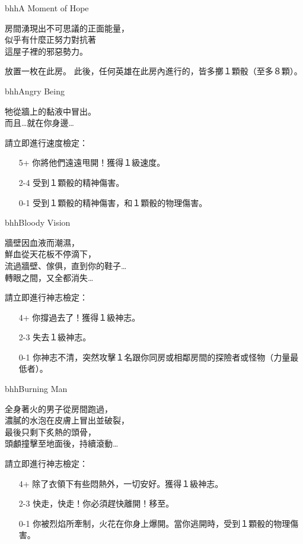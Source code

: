 %
\begin{EventCard}{bhh}{A Moment of Hope}
  \begin{CardStory}
    房間湧現出不可思議的正面能量，\\
    似乎有什麼正努力對抗著\\
    這屋子裡的邪惡勢力。
  \end{CardStory}
  放置一枚在此房。\smallbreak
  此後，任何英雄在此房內進行的，皆多擲１顆骰（至多８顆）。\smallbreak
\end{EventCard}%
\linebreak[0]%
\begin{EventCard}{bhh}{Angry Being}
  \begin{CardStory}
    牠從牆上的黏液中冒出。\\
    而且…就在你身邊…
  \end{CardStory}
  請立即進行速度檢定：
  \begin{itemize}
    \item[5+] 你將他們遠遠甩開！獲得１級速度。
    \item[2-4] 受到１顆骰的精神傷害。
    \item[0-1] 受到１顆骰的精神傷害，和１顆骰的物理傷害。
  \end{itemize}
\end{EventCard}%
\linebreak[0]%
\begin{EventCard}{bhh}{Bloody Vision}
  \begin{CardStory}
    牆壁因血液而潮濕，\\
    鮮血從天花板不停滴下，\\
    流過牆壁、傢俱，直到你的鞋子…\\
    轉眼之間，又全都消失…
  \end{CardStory}
  請立即進行神志檢定：
  \begin{itemize}
    \item[4+] 你撐過去了！獲得１級神志。
    \item[2-3] 失去１級神志。
    \item[0-1] 你神志不清，突然攻擊１名跟你同房或相鄰房間的探險者或怪物（力量最低者）。
  \end{itemize}
\end{EventCard}%
\linebreak[0]%
\begin{EventCard}{bhh}{Burning Man}
  \begin{CardStory}
    全身著火的男子從房間跑過，\\
    濃膩的水泡在皮膚上冒出並破裂，\\
    最後只剩下炙熱的頭骨，\\
    頭顱撞擊至地面後，持續滾動…
  \end{CardStory}
  請立即進行神志檢定：
  \begin{itemize}
    \item[4+] 除了衣領下有些悶熱外，一切安好。獲得１級神志。
    \item[2-3] 快走，快走！你必須趕快離開！移至。
    \item[0-1] 你被烈焰所牽制，火花在你身上爆開。當你逃開時，受到１顆骰的物理傷害。
  \end{itemize}
\end{EventCard}%
